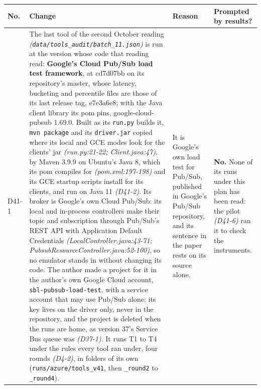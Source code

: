 \documentclass[11pt]{article}
\newcommand{\gl}[1]{{\color{soft}\itshape\small (#1)}}
\begin{document}
{\small
\begin{longtable}{@{}p{1.1cm} >{\raggedright\arraybackslash}p{6.1cm} >{\raggedright\arraybackslash}p{6.0cm} >{\raggedright\arraybackslash}p{2.2cm}@{}}
\toprule
\textbf{No.} & \textbf{Change} & \textbf{Reason} & \textbf{Prompted by results?} \\
\midrule
\endhead
D41-1 & The last tool of the second October reading \gl{\texttt{data/tools\_audit/batch\_11.json}} is run at the version whose code that reading read: \textbf{Google's Cloud Pub/Sub load test framework}, at cd7d07bb on its repository's master, whose latency, bucketing and percentile files are those of its last release tag, e7e3a6e8; with the Java client library its pom pins, google-cloud-pubsub 1.69.0. Built as its \texttt{run.py} builds it, \texttt{mvn package} and its \texttt{driver.jar} copied where its local and GCE modes look for the clients' jar \gl{run.py:21-22; Client.java:47}, by Maven 3.9.9 on Ubuntu's Java 8, which its pom compiles for \gl{pom.xml:197-198} and its GCE startup scripts install for its clients, and run on Java 11 \gl{D41-2}. Its broker is Google's own Cloud Pub/Sub: its local and in-process controllers make their topic and subscription through Pub/Sub's REST API with Application Default Credentials \gl{LocalController.java:43-71; PubsubResourceController.java:52-100}, so no emulator stands in without changing its code. The author made a project for it in the author's own Google Cloud account, \texttt{sbl-pubsub-load-test}, with a service account that may use Pub/Sub alone; its key lives on the driver only, never in the repository, and the project is deleted when the runs are home, as version 37's Service Bus queue was \gl{D37-1}. It runs T1 to T4 under the rules every tool ran under, four rounds \gl{D4-2}, in folders of its own (\texttt{runs/azure/tools\_v41}, then \texttt{\_round2} to \texttt{\_round4}). & It is Google's own load test for Pub/Sub, published in Google's Pub/Sub repository, and its sentence in the paper rests on its source alone. & \textbf{No.} None of its runs under this plan has been read: the pilot \gl{D41-6} ran it to check the instruments. \\

\end{longtable}}
\end{document}
